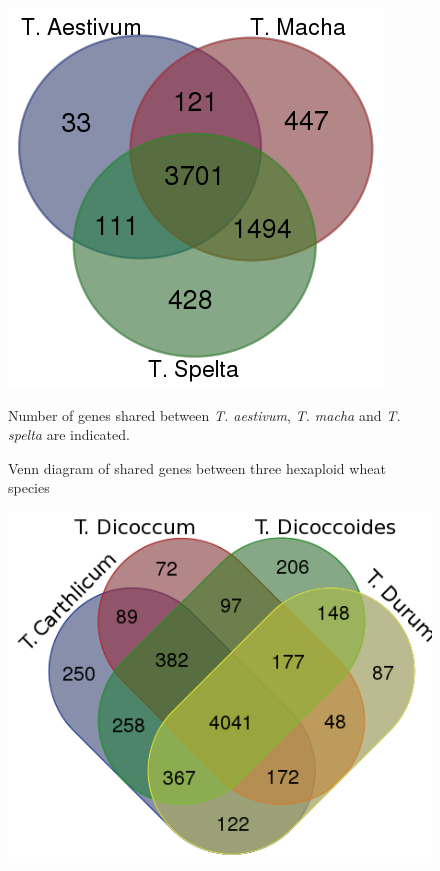 \documentclass[a4paper, 12pt]{article}
\begin{document}
\begin{onehalfspace}
\newpage 
\thispagestyle{empty}
    \begin{figure}
    \vspace{-1cm}
      \centering \includegraphics[scale=0.3]{Figures/Figure_19.png}
      \vspace{0.3cm}
      \caption{Venn diagram of shared genes between three hexaploid wheat species} 
      \label{fig:F19}
    \footnotesize{Number of genes shared between \textit{T. aestivum}, \textit{T. macha} and \textit{T. spelta} are indicated.}
    \end{figure}
    \begin{figure} 
    \vspace{-1.2cm}
      \centering \includegraphics[scale=0.3]{Figures/Figure_20.png}

\end{figure}
\end{onehalfspace}
\end{document}
